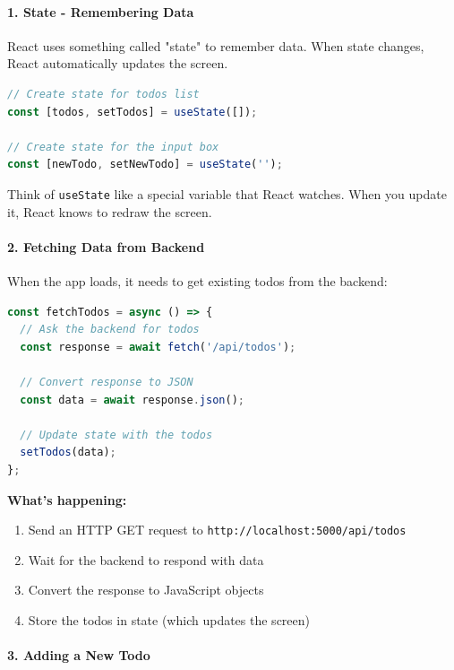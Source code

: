 \documentclass[12pt,a4paper]{article}
\begin{document}
\paragraph{1. State - Remembering Data}

React uses something called "state" to remember data. When state changes, React automatically updates the screen.

\begin{lstlisting}[language=JavaScript, caption=State in React]
// Create state for todos list
const [todos, setTodos] = useState([]);

// Create state for the input box
const [newTodo, setNewTodo] = useState('');
\end{lstlisting}

Think of \texttt{useState} like a special variable that React watches. When you update it, React knows to redraw the screen.

\paragraph{2. Fetching Data from Backend}

When the app loads, it needs to get existing todos from the backend:

\begin{lstlisting}[language=JavaScript, caption=Fetching todos]
const fetchTodos = async () => {
  // Ask the backend for todos
  const response = await fetch('/api/todos');
  
  // Convert response to JSON
  const data = await response.json();
  
  // Update state with the todos
  setTodos(data);
};
\end{lstlisting}

\textbf{What's happening:}
\begin{enumerate}
    \item Send an HTTP GET request to \texttt{http://localhost:5000/api/todos}
    \item Wait for the backend to respond with data
    \item Convert the response to JavaScript objects
    \item Store the todos in state (which updates the screen)
\end{enumerate}

\paragraph{3. Adding a New Todo}
\end{document}
